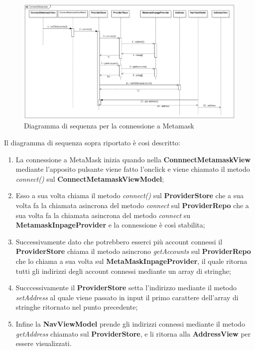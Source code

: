 \begin{figure}[H]
    \centering
    \includegraphics[scale = 0.45]{immagini/diagrammaMeta.png}
    \caption{Diagramma di sequenza per la connessione a Metamask}
\end{figure}

Il diagramma di sequenza sopra riportato è cosi descritto:

\begin{enumerate}
    \item La connessione a MetaMask inizia quando nella \textbf{ConnnectMetamaskView} mediante l'apposito pulsante viene fatto l'onclick e viene chiamato il metodo \textit{connect()} sul \textbf{ConnectMetamaskViewModel};
    \item Esso a sua volta chiama il metodo \textit{connect()} sul \textbf{ProviderStore} che a sua volta fa la chiamata asincrona del metodo \textit{connect} sul \textbf{ProviderRepo} che a sua volta fa la chiamata asincrona del metodo \textit{connect} su \textbf{MetamaskInpageProvider} e la connessione è così stabilita;
    \item Successivamente dato che potrebbero esserci più account connessi il \textbf{ProviderStore} chiama il metodo asincrono \textit{getAccounts} sul \textbf{ProviderRepo} che lo chiama a sua volta sul \textbf{MetaMaskInpageProvider}, il quale ritorna tutti gli indirizzi degli account connessi mediante un array di stringhe;
    \item Succcessivamente il \textbf{ProviderStore} setta l'indirizzo mediante il metodo \textit{setAddress} al quale viene passato in input il primo carattere dell'array di stringhe ritornato nel punto precedente;
    \item Infine la \textbf{NavViewModel} prende gli indirizzi connessi mediante il metodo \textit{getAddress} chiamato sul \textbf{ProviderStore}, e li ritorna alla \textbf{AddressView} per essere visualizzati.
\end{enumerate}

